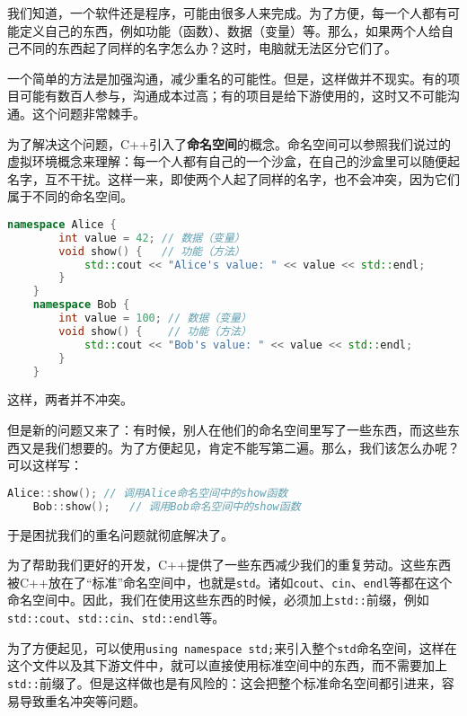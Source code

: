 我们知道，一个软件还是程序，可能由很多人来完成。为了方便，每一个人都有可能定义自己的东西，例如功能（函数）、数据（变量）等。那么，如果两个人给自己不同的东西起了同样的名字怎么办？这时，电脑就无法区分它们了。

一个简单的方法是加强沟通，减少重名的可能性。但是，这样做并不现实。有的项目可能有数百人参与，沟通成本过高；有的项目是给下游使用的，这时又不可能沟通。这个问题非常棘手。

为了解决这个问题，C++引入了\textbf{命名空间}的概念。命名空间可以参照我们说过的虚拟环境概念来理解：每一个人都有自己的一个沙盒，在自己的沙盒里可以随便起名字，互不干扰。这样一来，即使两个人起了同样的名字，也不会冲突，因为它们属于不同的命名空间。
\begin{lstlisting}[language=C++]
    namespace Alice {
        int value = 42; // 数据（变量）
        void show() {   // 功能（方法）
            std::cout << "Alice's value: " << value << std::endl;
        }
    }
    namespace Bob {
        int value = 100; // 数据（变量）
        void show() {    // 功能（方法）
            std::cout << "Bob's value: " << value << std::endl;
        }
    }
\end{lstlisting}
这样，两者并不冲突。

但是新的问题又来了：有时候，别人在他们的命名空间里写了一些东西，而这些东西又是我们想要的。为了方便起见，肯定不能写第二遍。那么，我们该怎么办呢？可以这样写：
\begin{lstlisting}[language=C++]
    Alice::show(); // 调用Alice命名空间中的show函数
    Bob::show();   // 调用Bob命名空间中的show函数   
\end{lstlisting}
于是困扰我们的重名问题就彻底解决了。

为了帮助我们更好的开发，C++提供了一些东西减少我们的重复劳动。这些东西被C++放在了“标准”命名空间中，也就是\texttt{std}。诸如\texttt{cout}、\texttt{cin}、\texttt{endl}等都在这个命名空间中。因此，我们在使用这些东西的时候，必须加上\texttt{std::}前缀，例如\texttt{std::cout}、\texttt{std::cin}、\texttt{std::endl}等。

为了方便起见，可以使用\texttt{using namespace std;}来引入整个\texttt{std}命名空间，这样在这个文件以及其下游文件中，就可以直接使用标准空间中的东西，而不需要加上\texttt{std::}前缀了。但是这样做也是有风险的：这会把整个标准命名空间都引进来，容易导致重名冲突等问题。

